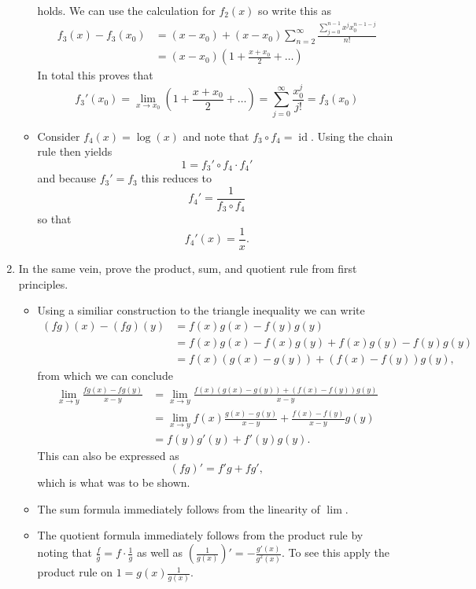 \documentclass{article}
\begin{document}
\begin{enumerate}
\begin{itemize}
	holds. We can use the calculation for $f_2(x)$ so write this as
	\begin{align*}
	f_3(x) - f_3(x_0) &= (x - x_0) + (x - x_0) \sum_{n = 2}^\infty \frac{\sum_{j = 0}^{n - 1} x^j x_0^{n - 1 - j}}{n!} \\
	&= (x - x_0) \left(1 + \frac{x + x_0}{2} + \dots \right)
	\end{align*}
	In total this proves that
	$$
	f_3'(x_0) = \lim_{x \rightarrow x_0} \left(1 + \frac{x + x_0}{2} + \dots \right) = \sum_{j = 0}^\infty \frac{x_0^j}{j!} = f_3(x_0)
	$$
	\item Consider $f_4(x) = \log(x)$ and note that $f_3 \circ f_4 = \operatorname{id}$. Using the chain rule then yields
	$$
	1 = f_3' \circ f_4 \cdot f_4'
	$$
	and because $f_3' = f_3$ this reduces to
	$$
	f_4' = \frac{1}{f_3 \circ f_4}
	$$
	so that
	$$
	f_4'(x) = \frac{1}{x}.
	$$
	\end{itemize}

\item In the same vein, prove the product, sum, and quotient rule from first principles.
	\begin{itemize}
	\item Using a similiar construction to the triangle inequality we can write
	\begin{align*}
	(fg)(x) - (fg)(y) &= f(x)g(x) - f(y)g(y) \\
	&= f(x)g(x) - f(x)g(y) + f(x)g(y) - f(y)g(y) \\
	&= f(x)(g(x) - g(y)) + (f(x) - f(y))g(y),
	\end{align*}
	from which we can conclude
	\begin{align*}
	\lim_{x \rightarrow y} \frac{fg(x) - fg(y)}{x - y} &= \lim_{x \rightarrow y} \frac{f(x)(g(x) - g(y)) + (f(x) - f(y))g(y)}{x - y} \\
	&= \lim_{x \rightarrow y} f(x) \frac{g(x) - g(y)}{x - y} + \frac{f(x) - f(y)}{x - y} g(y) \\
	&= f(y) g'(y) + f'(y)g(y).
	\end{align*}
	This can also be expressed as
	$$
	(fg)' = f'g + fg',
	$$
	which is what was to be shown.
	\item The sum formula immediately follows from the linearity of $\lim$.
	\item The quotient formula immediately follows from the product rule by noting that $\frac{f}{g} = f \cdot \frac{1}{g}$ as well as $\left(\frac{1}{g(x)}\right)' = -\frac{g'(x)}{g^2(x)}$. To see this apply the product rule on $1 = g(x) \frac{1}{g(x)}$.
	\end{itemize}


\end{enumerate}
\end{document}
